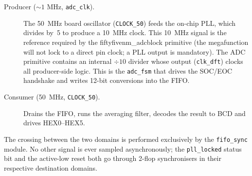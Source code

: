 \documentclass[12pt,letterpaper]{article}
\begin{document}
\begin{description}
  \item[Producer (\(\sim 1\) MHz, \texttt{adc\_clk}).]  The 50~MHz board oscillator
    (\texttt{CLOCK\_50}) feeds the on-chip PLL, which divides by~5 to produce a
    10~MHz clock.  This 10~MHz signal is the reference required by the
    \textsf{fiftyfivenm\_adcblock} primitive (the megafunction will not lock to a
    direct pin clock; a PLL output is mandatory).  The ADC primitive contains an
    internal \(\div 10\) divider whose output (\texttt{clk\_dft}) clocks all
    producer-side logic.  This is the \texttt{adc\_fsm} that drives the SOC/EOC
    handshake and writes 12-bit conversions into the FIFO.

  \item[Consumer (50~MHz, \texttt{CLOCK\_50}).]  Drains the FIFO, runs the
    averaging filter, decodes the result to BCD and drives HEX0--HEX5.
\end{description}

The crossing between the two domains is performed exclusively by the
\texttt{fifo\_sync} module.  No other signal is ever sampled
asynchronously; the \texttt{pll\_locked} status bit and the active-low reset
both go through 2-flop synchronisers in their respective destination domains.
\end{document}
